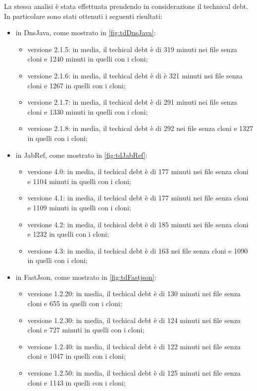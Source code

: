La stessa analisi è stata effettuata prendendo in considerazione il technical debt. In particolare sono stati ottenuti i seguenti risultati:
\begin{itemize}
		\item in DnsJava, come mostrato in \autoref{fig:tdDnsJava}:
	\begin{itemize}
		\item versione 2.1.5: in media, il techical debt è di 319 minuti nei file senza cloni e 1240 minuti in quelli con i cloni;
		\item versione 2.1.6: in media, il techical debt è di è 321 minuti nei file senza cloni e 1267 in quelli con i cloni;
		\item versione 2.1.7: in media, il techical debt è di 291 minuti nei file senza cloni e 1330 minuti in quelli con i cloni;
		\item versione 2.1.8: in media, il techical debt è di 292 nei file senza cloni e 1327 in quelli con i cloni;
	\end{itemize}
	\item in JabRef, come mostrato in \autoref{fig:tdJabRef}:
	\begin{itemize}
		\item versione 4.0: in media, il techical debt è di 177 minuti nei file senza cloni e 1104 minuti in quelli con i cloni;
		\item versione 4.1: in media, il techical debt è di 177 minuti nei file senza cloni e 1109 minuti in quelli con i cloni;
		\item versione 4.2: in media, il techical debt è di 185 minuti nei file senza cloni e 1232 in quelli con i cloni;
		\item versione 4.3: in media, il techical debt è di 163 nei file senza cloni e 1090 in quelli con i cloni;
	\end{itemize} 
		\item in FastJson, come mostrato in \autoref{fig:tdFastjson}:
	\begin{itemize}
		\item versione 1.2.20: in media, il techical debt è di 130 minuti nei file senza cloni e 655 in quelli con i cloni;
		\item versione 1.2.30: in media, il techical debt è di 124 minuti nei file senza cloni e 727 minuti in quelli con i cloni;
		\item versione 1.2.40: in media, il techical debt è di 122 minuti nei file senza cloni e 1047 in quelli con i cloni;
		\item versione 1.2.50: in media, il techical debt è di 125 minuti nei file senza cloni e 1143 in quelli con i cloni;
	\end{itemize}
\end{itemize}
